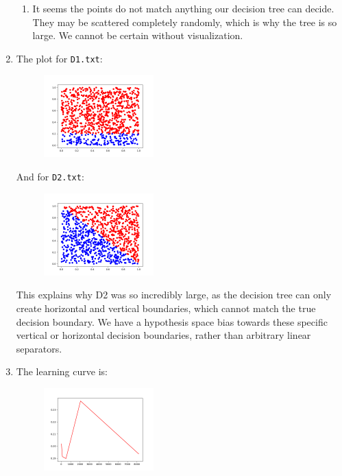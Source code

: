 \documentclass[a4paper]{article}
\theoremstyle{definition}
\begin{document}
\begin{enumerate}
\begin{enumerate}
			\item It seems the points do not match anything our decision tree can decide. They may be scattered completely randomly, which is why the tree is so large. We cannot be certain without visualization.
			
		\end{enumerate}
			
		\item The plot for \texttt{D1.txt}:
		
		\begin{figure}[h!]
			\centering
			\includegraphics[width=0.4\textwidth]{data/d2plot.png}  
			\captionsetup{labelformat=empty}
			\caption{}
			\label{fig:fig1}
		\end{figure}
	And for \texttt{D2.txt}:
	
	\begin{figure}[h!]
		\centering
		\includegraphics[width=0.4\textwidth]{data/d1plot.png}  
		\captionsetup{labelformat=empty}
		\caption{}
		\label{fig:fig2}
	\end{figure}
	This explains why D2 was so incredibly large, as the decision tree can only create horizontal and vertical boundaries, which cannot match the true decision boundary. We have a hypothesis space bias towards these specific vertical or horizontal decision boundaries, rather than arbitrary linear separators.
	
	
	\item The learning curve is:\\
	
	\begin{figure}[h!]
		\centering
		\includegraphics[width=0.4\textwidth]{data/roc.png}
		\captionsetup{labelformat=empty}
		\caption{}
		\label{fig:fig8}
	\end{figure}


\end{enumerate}
\end{document}
